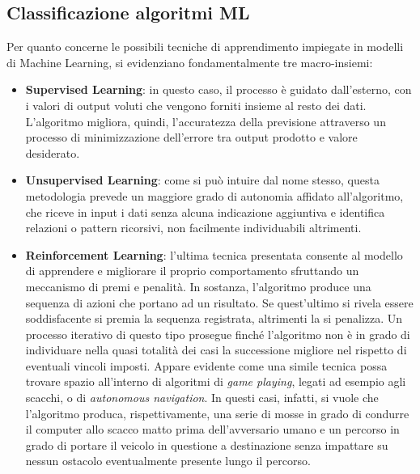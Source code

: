 \subsection{Classificazione algoritmi ML}

Per quanto concerne le possibili tecniche di apprendimento impiegate in modelli di Machine Learning, si evidenziano fondamentalmente tre macro-insiemi:

    \begin{itemize}

        \item \textbf{Supervised Learning}: in questo caso, il processo è guidato dall'esterno, con i valori di output voluti che vengono forniti insieme al resto dei dati. L'algoritmo migliora, quindi, l'accuratezza della previsione attraverso un processo di minimizzazione dell'errore tra output prodotto e valore desiderato. 
        
        \item \textbf{Unsupervised Learning}: come si può intuire dal nome stesso, questa metodologia prevede un maggiore grado di autonomia affidato all'algoritmo, che riceve in input i dati senza alcuna indicazione aggiuntiva e identifica relazioni o pattern ricorsivi, non facilmente individuabili altrimenti.
        
        \item \textbf{Reinforcement Learning}: l'ultima tecnica presentata consente al modello di apprendere e migliorare il proprio comportamento sfruttando un meccanismo di premi e penalità. In sostanza, l'algoritmo produce una sequenza di azioni che portano ad un risultato. Se quest'ultimo si rivela essere soddisfacente si premia la sequenza registrata, altrimenti la si penalizza. Un processo iterativo di questo tipo prosegue finché l'algoritmo non è in grado di individuare nella quasi totalità dei casi la successione migliore nel rispetto di eventuali vincoli imposti. Appare evidente come una simile tecnica possa trovare spazio all'interno di algoritmi di \emph{game playing}, legati ad esempio agli scacchi, o di \emph{autonomous navigation}. In questi casi, infatti, si vuole che l'algoritmo produca, rispettivamente, una serie di mosse in grado di condurre il computer allo scacco matto prima dell'avversario umano e un percorso in grado di portare il veicolo in questione a destinazione senza impattare su nessun ostacolo eventualmente presente lungo il percorso. 
        
    \end{itemize}

